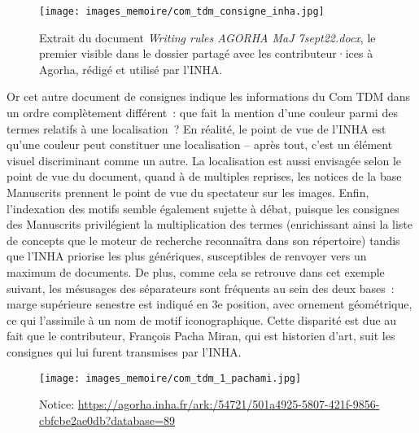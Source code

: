 \documentclass[a4paper,12pt, twoside]{book}
\begin{document}
\begin{figure}[!h]
    \centering
    \texttt{[image: images\_memoire/com\_tdm\_consigne\_inha.jpg]}
    \caption*{Extrait du document \textit{Writing rules AGORHA MaJ 7sept22.docx}, le premier visible dans le dossier partagé avec les contributeur·ices à Agorha, rédigé et utilisé par l'INHA.}
    \label{Consigne de saisie contradictoire}
\end{figure}

Or cet autre document de consignes indique les informations du \textsf{Com TDM} dans un ordre complètement différent~: que fait la mention d’une couleur parmi des termes relatifs à une localisation~? En réalité, le point de vue de l’INHA est qu’une couleur peut constituer une localisation -- après tout, c’est un élément visuel discriminant comme un autre. La localisation est aussi envisagée selon le point de vue du document, quand à de multiples reprises, les notices de la base Manuscrits prennent le point de vue du spectateur sur les images. Enfin, l’indexation des motifs semble également sujette à débat, puisque les consignes des Manuscrits privilégient la multiplication des termes (enrichissant ainsi la liste de concepts que le moteur de recherche reconnaîtra dans son répertoire) tandis que l’INHA priorise les plus génériques, susceptibles de renvoyer vers un maximum de documents. De plus, comme cela se retrouve dans cet exemple suivant, les mésusages des séparateurs sont fréquents au sein des deux bases~: marge supérieure senestre est indiqué en 3e position, avec ornement géométrique, ce qui l’assimile à un nom de motif iconographique. Cette disparité est due au fait que le contributeur, François Pacha Miran, qui est historien d’art, suit les consignes qui lui furent transmises par l’INHA.

\begin{figure}[!h]
    \centering
    \texttt{[image: images\_memoire/com\_tdm\_1\_pachami.jpg]}
    \caption{Notice: \url{https://agorha.inha.fr/ark:/54721/501a4925-5807-421f-9856-cbfcbe2ae0db?database=89}}
    \label{Un exemple de couac.}
\end{figure}
\end{document}
